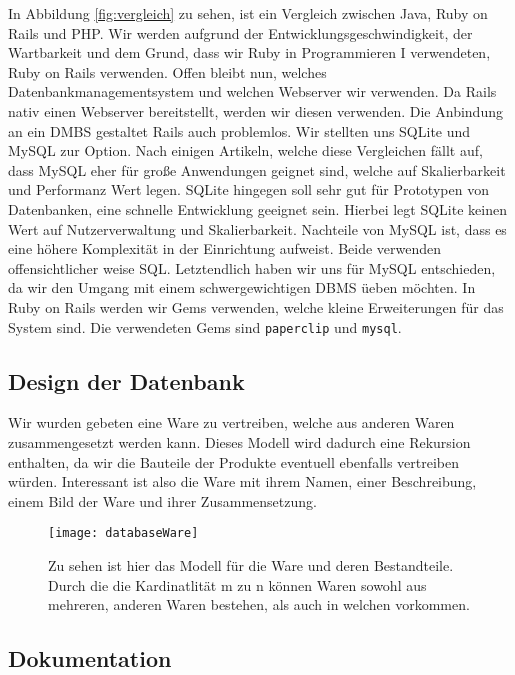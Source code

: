 \documentclass[pdftex,10pt,a4paper]{article}
\begin{document}
In Abbildung \ref{fig:vergleich} zu sehen, ist ein Vergleich zwischen Java, Ruby on Rails und PHP. Wir werden aufgrund der Entwicklungsgeschwindigkeit, der Wartbarkeit und dem Grund, dass wir Ruby in Programmieren I verwendeten, Ruby on Rails verwenden. Offen bleibt nun, welches Datenbankmanagementsystem und welchen Webserver wir verwenden. Da Rails nativ einen Webserver bereitstellt, werden wir diesen verwenden. Die Anbindung an ein DMBS gestaltet Rails auch problemlos. Wir stellten uns SQLite und MySQL zur Option. Nach einigen Artikeln, welche diese Vergleichen f\"allt auf, dass MySQL eher f\"ur gro{\ss}e Anwendungen geignet sind, welche auf Skalierbarkeit und Performanz Wert legen. SQLite hingegen soll sehr gut f\"ur Prototypen von Datenbanken, eine schnelle Entwicklung geeignet sein. Hierbei legt SQLite keinen Wert auf Nutzerverwaltung und Skalierbarkeit. Nachteile von MySQL ist, dass es eine h\"ohere Komplexit\"at in der Einrichtung aufweist. Beide verwenden offensichtlicher weise SQL. Letztendlich haben wir uns f\"ur MySQL entschieden, da wir den Umgang mit einem schwergewichtigen DBMS \"ueben m\"ochten. In Ruby on Rails werden wir Gems verwenden, welche kleine Erweiterungen f\"ur das System sind. Die verwendeten Gems sind \texttt{paperclip} und \texttt{mysql}.

\subsection{Design der Datenbank}
\label{sec:dbdesign}
Wir wurden gebeten eine Ware zu vertreiben, welche aus anderen Waren zusammengesetzt werden kann. Dieses Modell wird dadurch eine Rekursion enthalten, da wir die Bauteile der Produkte eventuell ebenfalls vertreiben w\"urden. Interessant ist also die Ware mit ihrem Namen, einer Beschreibung, einem Bild der Ware und ihrer Zusammensetzung.

\begin{wrapfigure}{R}{0.5\textwidth}
  	\begin{center}
    	\texttt{[image: databaseWare]}
 	 \end{center}
  	\caption{Zu sehen ist hier das Modell f\"ur die Ware und deren Bestandteile. Durch die die Kardinatlit\"at m zu n k\"onnen Waren sowohl aus mehreren, anderen Waren bestehen, als auch in welchen vorkommen.}
\end{wrapfigure}

\subsection{Dokumentation}
\end{document}
